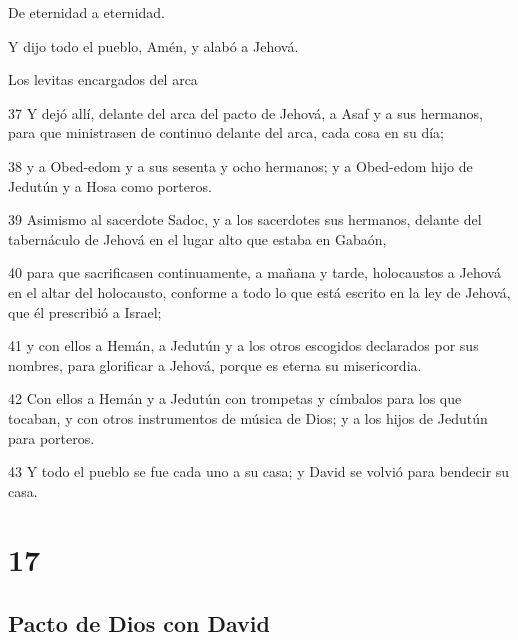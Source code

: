 \par De eternidad a eternidad.
\par Y dijo todo el pueblo, Amén, y alabó a Jehová.
\par Los levitas encargados del arca
\par 37 Y dejó allí, delante del arca del pacto de Jehová, a Asaf y a sus hermanos, para que ministrasen de continuo delante del arca, cada cosa en su día;
\par 38 y a Obed-edom y a sus sesenta y ocho hermanos; y a Obed-edom hijo de Jedutún y a Hosa como porteros.
\par 39 Asimismo al sacerdote Sadoc, y a los sacerdotes sus hermanos, delante del tabernáculo de Jehová en el lugar alto que estaba en Gabaón,
\par 40 para que sacrificasen continuamente, a mañana y tarde, holocaustos a Jehová en el altar del holocausto, conforme a todo lo que está escrito en la ley de Jehová, que él prescribió a Israel;
\par 41 y con ellos a Hemán, a Jedutún y a los otros escogidos declarados por sus nombres, para glorificar a Jehová, porque es eterna su misericordia. 
\par 42 Con ellos a Hemán y a Jedutún con trompetas y címbalos para los que tocaban, y con otros instrumentos de música de Dios; y a los hijos de Jedutún para porteros.
\par 43 Y todo el pueblo se fue cada uno a su casa; y David se volvió para bendecir su casa. 

\chapter{17}

\section*{Pacto de Dios con David}

